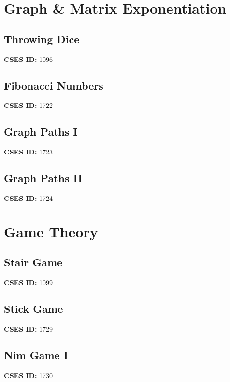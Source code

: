 \documentclass[10pt, a4paper, twocolumn, landscape]{article}
\begin{document}
\section{Graph \& Matrix Exponentiation}
\subsection{Throwing Dice}
\textbf{CSES ID:} 1096 \\

\vspace{0.2cm}
\subsection{Fibonacci Numbers}
\textbf{CSES ID:} 1722 \\

\vspace{0.2cm}
\subsection{Graph Paths I}
\textbf{CSES ID:} 1723 \\

\vspace{0.2cm}
\subsection{Graph Paths II}
\textbf{CSES ID:} 1724 \\

\vspace{0.2cm}
\section{Game Theory}
\subsection{Stair Game}
\textbf{CSES ID:} 1099 \\

\vspace{0.2cm}
\subsection{Stick Game}
\textbf{CSES ID:} 1729 \\

\vspace{0.2cm}
\subsection{Nim Game I}
\textbf{CSES ID:} 1730 \\

\vspace{0.2cm}
\end{document}
